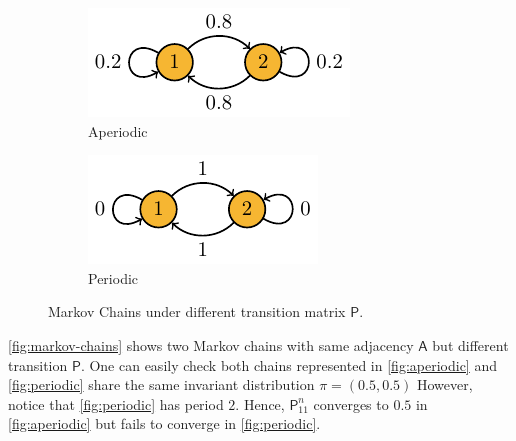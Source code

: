 \documentclass[a4paper]{article}
\begin{document}
\begin{figure}[h]
	\centering
	\begin{subfigure}{0.4\textwidth}
		\centering
		\includegraphics[scale=1]{figures/markov-periodic.pdf}
		\caption{Aperiodic}
		\label{fig:aperiodic}
	\end{subfigure}
	\begin{subfigure}{0.4\textwidth}
		\centering
		\includegraphics[scale=1]{figures/markov-aperiodic.pdf}
		\caption{Periodic}
		\label{fig:periodic}
	\end{subfigure}
	\caption{Markov Chains under different transition matrix $\mathsf{P}$.}
	\label{fig:markov-chains}
\end{figure}

\begin{remark}
	\autoref{fig:markov-chains} shows two Markov chains with same adjacency $\mathsf{A}$ but different transition $\mathsf{P}$.
	One can easily check both chains represented in \autoref{fig:aperiodic} and \autoref{fig:periodic}
	share the same invariant distribution $\pi=(0.5,0.5)$
	However, notice that \autoref{fig:periodic} has period $2$.
	Hence, $\mathsf{P}_{11}^{n}$ converges to $0.5$ in \autoref{fig:aperiodic} but fails to converge in \autoref{fig:periodic}.
\end{remark}

\printglossaries
\printbibliography
\end{document}
